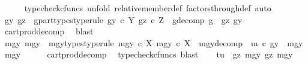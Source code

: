 \begin{isabellebody}
\ \ \ \ \isamarkupfalse%
\ {\isacharparenleft}{\kern0pt}typecheck{\isacharunderscore}{\kern0pt}cfuncs{\isacharcomma}{\kern0pt}\ unfold\ relative{\isacharunderscore}{\kern0pt}member{\isacharunderscore}{\kern0pt}def{}\ factors{\isacharunderscore}{\kern0pt}through{\isacharunderscore}{\kern0pt}def{}{\isacharcomma}{\kern0pt}\ auto{\isacharparenright}{\kern0pt}\isanewline
\ \ \isamarkupfalse%
\ \isamarkupfalse%
\ gy\ gz\ \ g{\isacharunderscore}{\kern0pt}part{\isacharunderscore}{\kern0pt}types{\isacharbrackleft}{\kern0pt}type{\isacharunderscore}{\kern0pt}rule{\isacharbrackright}{\kern0pt}{\isacharcolon}{\kern0pt}\ {\isachardoublequoteopen}gy\ {\isasymin}\isactrlsub c\ Y{\isachardoublequoteclose}\ {\isachardoublequoteopen}gz\ {\isasymin}\isactrlsub c\ Z{\isachardoublequoteclose}\ \ g{\isacharunderscore}{\kern0pt}decomp{\isacharcolon}{\kern0pt}\ {\isachardoublequoteopen}g\ {\isacharequal}{\kern0pt}\ {\isasymlangle}gz{\isacharcomma}{\kern0pt}\ gy{\isasymrangle}{\isachardoublequoteclose}\isanewline
\ \ \ \ \isamarkupfalse%
\ cart{\isacharunderscore}{\kern0pt}prod{\isacharunderscore}{\kern0pt}decomp\ \isamarkupfalse%
\ blast\isanewline
\ \ \isamarkupfalse%
\ \isamarkupfalse%
\ mgy{}\ mgy{}\ \ mgy{\isacharunderscore}{\kern0pt}types{\isacharbrackleft}{\kern0pt}type{\isacharunderscore}{\kern0pt}rule{\isacharbrackright}{\kern0pt}{\isacharcolon}{\kern0pt}\ {\isachardoublequoteopen}mgy{}\ {\isasymin}\isactrlsub c\ X{\isachardoublequoteclose}\ {\isachardoublequoteopen}mgy{}\ {\isasymin}\isactrlsub c\ X{\isachardoublequoteclose}\ \ mgy{\isacharunderscore}{\kern0pt}decomp{\isacharcolon}{\kern0pt}\ \ {\isachardoublequoteopen}m\ {\isasymcirc}\isactrlsub c\ gy\ {\isacharequal}{\kern0pt}\ {\isasymlangle}mgy{}{\isacharcomma}{\kern0pt}\ mgy{}{\isasymrangle}{\isachardoublequoteclose}\isanewline
\ \ \ \ \isamarkupfalse%
\ cart{\isacharunderscore}{\kern0pt}prod{\isacharunderscore}{\kern0pt}decomp\ \isamarkupfalse%
\ {\isacharparenleft}{\kern0pt}typecheck{\isacharunderscore}{\kern0pt}cfuncs{\isacharcomma}{\kern0pt}\ blast{\isacharparenright}{\kern0pt}\isanewline
\isanewline
\ \ \isamarkupfalse%
\ {\isachardoublequoteopen}{\isasymlangle}t{\isacharcomma}{\kern0pt}u{\isasymrangle}\ {\isacharequal}{\kern0pt}\ {\isasymlangle}{\isasymlangle}gz{\isacharcomma}{\kern0pt}\ mgy{}{\isasymrangle}{\isacharcomma}{\kern0pt}\ {\isasymlangle}gz{\isacharcomma}{\kern0pt}\ mgy{}{\isasymrangle}{\isasymrangle}{\isachardoublequoteclose}\isanewline

\end{isabellebody}
